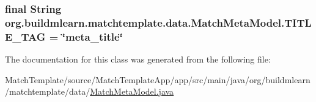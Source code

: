 \subsubsection[{\texorpdfstring{T\+I\+T\+L\+E\+\_\+\+T\+AG}{TITLE_TAG}}]{\setlength{\rightskip}{0pt plus 5cm}final String org.\+buildmlearn.\+matchtemplate.\+data.\+Match\+Meta\+Model.\+T\+I\+T\+L\+E\+\_\+\+T\+AG = \char`\"{}meta\+\_\+title\char`\"{}\hspace{0.3cm}{\ttfamily [static]}}\hypertarget{classorg_1_1buildmlearn_1_1matchtemplate_1_1data_1_1MatchMetaModel_af9280ec17d2a080ab8774a5973cf1ff4}{}\label{classorg_1_1buildmlearn_1_1matchtemplate_1_1data_1_1MatchMetaModel_af9280ec17d2a080ab8774a5973cf1ff4}


The documentation for this class was generated from the following file\+:\begin{DoxyCompactItemize}
\item 
Match\+Template/source/\+Match\+Template\+App/app/src/main/java/org/buildmlearn/matchtemplate/data/\hyperlink{MatchMetaModel_8java}{Match\+Meta\+Model.\+java}\end{DoxyCompactItemize}

